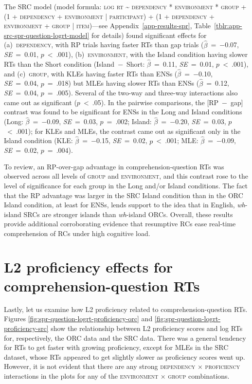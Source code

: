 The SRC model (model formula: \textsc{log rt \~{} dependency * environment * group + (1 + dependency + environment | participant) + (1 + dependency + environment + group | item)}---see Appendix~\ref{app-results-spr}, Table~\ref{tblr:app-src-spr-question-logrt-model} for details) found significant effects for (a)~\textsc{dependency}, with RP trials having faster RTs than gap trials ($\hat{\beta}$~=~−0.07, \textit{SE}~=~0.01, $p$~<~.001), (b)~\textsc{environment}, with the Island condition having slower RTs than the Short condition (Island~−~Short: $\hat{\beta}$~=~0.11, \textit{SE}~=~0.01, $p$~<~.001), and (c)~\textsc{group}, with KLEs having faster RTs than ENSs ($\hat{\beta}$~=~−0.10, \textit{SE}~=~0.04, $p$~=~.018) but MLEs having slower RTs than ENSs ($\hat{\beta}$~=~0.12, \textit{SE}~=~0.04, $p$~=~.005). Several of the two-way and three-way interactions also came out as significant ($p$~<~.05). In the pairwise comparisons, the [RP~−~gap] contrast was found to be significant for ENSs in the Long and Island conditions (Long: $\hat{\beta}$~=~−0.09, \textit{SE}~=~0.03, $p$~=~.002; Island: $\hat{\beta}$~=~−0.20, \textit{SE}~=~0.03, $p$~<~.001); for KLEs and MLEs, the contrast came out as significant only in the Island condition (KLE: $\hat{\beta}$~=~−0.15, \textit{SE}~=~0.02, $p$~<~.001; MLE: $\hat{\beta}$~=~−0.09, \textit{SE}~=~0.02, $p$~=~.004).

To review, an RP-over-gap advantage in comprehension-question RTs was observed across all levels of \textsc{group} and \textsc{environment}, and this contrast rose to the level of significance for each group in the Long and/or Island conditions. The fact that the RP advantage was larger in the SRC Island condition than in the ORC Island condition, at least for ENSs, lends support to the idea that in English, \textit{wh}-island SRCs are stronger islands than \textit{wh}-island ORCs. Overall, these results provide additional corroborating evidence that resumptive RCs ease real-time comprehension of RCs under high cognitive load. 

\section{L2 proficiency effects for comprehension-question RTs}\label{spr-qrt-proficiency}

Lastly, let us examine how L2 proficiency related to comprehension-question RTs. Figures \ref{fig:spr-question-logrt-proficiency-orc} and \ref{fig:spr-question-logrt-proficiency-src} show the relationship between L2 proficiency scores and log RTs for, respectively, the ORC data and the SRC data. There was a general tendency for RTs to get faster with growing proficiency, except for MLEs in the SRC dataset, whose RTs appeared to get slightly slower as proficiency scores went up. However, it is not evident that there are any strong \textsc{dependency} × \textsc{proficiency} interactions in the plots for any of the \textsc{environment} × \textsc{group} combinations.

